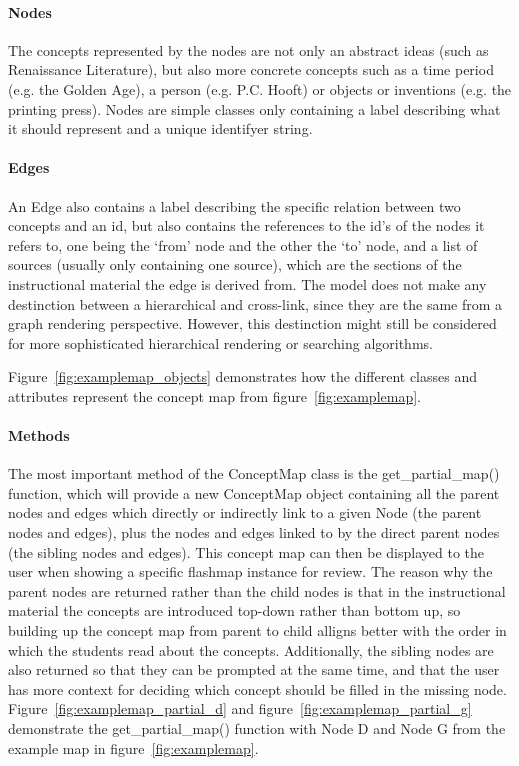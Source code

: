 \paragraph{Nodes} The concepts represented by the nodes are not only an abstract ideas (such as Renaissance Literature), but also more concrete concepts such as a time period (e.g. the Golden Age), a person (e.g. P.C. Hooft) or objects or inventions (e.g. the printing press). Nodes are simple classes only containing a label describing what it should represent and a unique identifyer string.

\paragraph{Edges} An Edge also contains a label describing the specific relation between two concepts and an id, but also contains the references to the id's of the nodes it refers to, one being the `from' node and the other the `to' node, and a list of sources (usually only containing one source), which are the sections of the instructional material the edge is derived from. The model does not make any destinction between a hierarchical and cross-link, since they are the same from a graph rendering perspective. However, this destinction might still be considered for more sophisticated hierarchical rendering or searching algorithms.

Figure~\ref{fig:examplemap_objects} demonstrates how the different classes and attributes represent the concept map from figure~\ref{fig:examplemap}.

\paragraph{Methods} The most important method of the ConceptMap class is the get\_partial\_map() function, which will provide a new ConceptMap object containing all the parent nodes and edges which directly or indirectly link to a given Node (the parent nodes and edges), plus the nodes and edges linked to by the direct parent nodes (the sibling nodes and edges). This concept map can then be displayed to the user when showing a specific flashmap instance for review. The reason why the parent nodes are returned rather than the child nodes is that in the instructional material the concepts are introduced top-down rather than bottom up, so building up the concept map from parent to child alligns better with the order in which the students read about the concepts. Additionally, the sibling nodes are also returned so that they can be prompted at the same time, and that the user has more context for deciding which concept should be filled in the missing node. Figure~\ref{fig:examplemap_partial_d} and figure~\ref{fig:examplemap_partial_g} demonstrate the get\_partial\_map() function with Node D and Node G from the example map in figure~\ref{fig:examplemap}.

